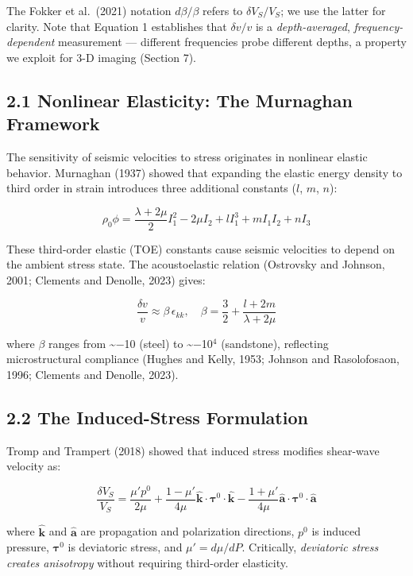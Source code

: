 \documentclass[12pt]{article}
\begin{document}
The Fokker et al.~(2021) notation \(d\beta/\beta\) refers to
\(\delta V_S/V_S\); we use the latter for clarity. Note that Equation 1
establishes that \(\delta v/v\) is a \emph{depth-averaged},
\emph{frequency-dependent} measurement --- different frequencies probe
different depths, a property we exploit for 3-D imaging (Section 7).

\subsection{2.1 Nonlinear Elasticity: The Murnaghan
Framework}\label{nonlinear-elasticity-the-murnaghan-framework}

The sensitivity of seismic velocities to stress originates in nonlinear
elastic behavior. Murnaghan (1937) showed that expanding the elastic
energy density to third order in strain introduces three additional
constants (\(l\), \(m\), \(n\)):

\[\rho_0 \phi = \frac{\lambda + 2\mu}{2} I_1^2 - 2\mu I_2 + l I_1^3 + m I_1 I_2 + n I_3 \tag{2}\]

These third-order elastic (TOE) constants cause seismic velocities to
depend on the ambient stress state. The acoustoelastic relation
(Ostrovsky and Johnson, 2001; Clements and Denolle, 2023) gives:

\[\frac{\delta v}{v} \approx \beta \, \epsilon_{kk}, \quad \beta = \frac{3}{2} + \frac{l + 2m}{\lambda + 2\mu} \tag{3}\]

where \(\beta\) ranges from \textasciitilde{}−10 (steel) to
\textasciitilde{}−10\(^4\) (sandstone), reflecting microstructural
compliance (Hughes and Kelly, 1953; Johnson and Rasolofosaon, 1996;
Clements and Denolle, 2023).

\subsection{2.2 The Induced-Stress
Formulation}\label{the-induced-stress-formulation}

Tromp and Trampert (2018) showed that induced stress modifies shear-wave
velocity as:

\[\frac{\delta V_S}{V_S} = \frac{\mu' p^0}{2\mu} + \frac{1 - \mu'}{4\mu} \hat{\mathbf{k}} \cdot \boldsymbol{\tau}^0 \cdot \hat{\mathbf{k}} - \frac{1 + \mu'}{4\mu} \hat{\mathbf{a}} \cdot \boldsymbol{\tau}^0 \cdot \hat{\mathbf{a}} \tag{4}\]

where \(\hat{\mathbf{k}}\) and \(\hat{\mathbf{a}}\) are propagation and
polarization directions, \(p^0\) is induced pressure,
\(\boldsymbol{\tau}^0\) is deviatoric stress, and \(\mu' = d\mu/dP\).
Critically, \emph{deviatoric stress creates anisotropy} without
requiring third-order elasticity.
\end{document}
